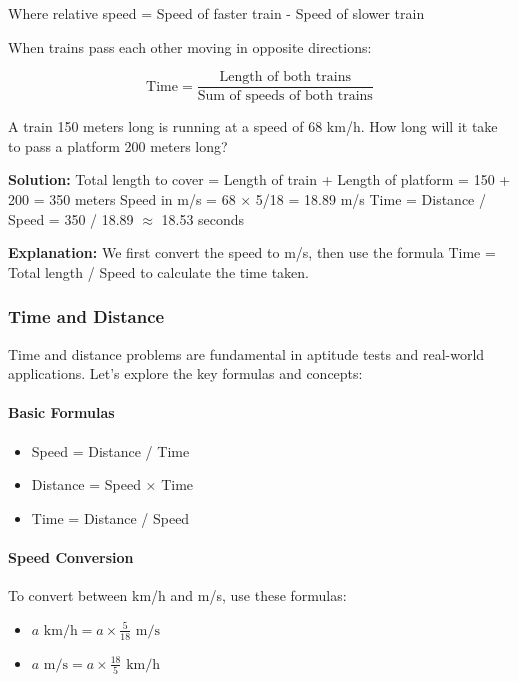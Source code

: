 Where relative speed = Speed of faster train - Speed of slower train

When trains pass each other moving in opposite directions:

\begin{equation}
    \text{Time} = \frac{\text{Length of both trains}}{\text{Sum of speeds of both trains}}
\end{equation}

\begin{example}
A train 150 meters long is running at a speed of 68 km/h. How long will it take to pass a platform 200 meters long?

\textbf{Solution:}
Total length to cover = Length of train + Length of platform = 150 + 200 = 350 meters
Speed in m/s = 68 × 5/18 = 18.89 m/s
Time = Distance / Speed = 350 / 18.89 $\approx$ 18.53 seconds

\textbf{Explanation:} We first convert the speed to m/s, then use the formula Time = Total length / Speed to calculate the time taken.
\end{example}

\subsubsection{Time and Distance}

Time and distance problems are fundamental in aptitude tests and
real-world applications. Let's explore the key formulas and concepts:

\paragraph{Basic Formulas}

\begin{itemize}
    \item Speed = Distance / Time
    \item Distance = Speed × Time
    \item Time = Distance / Speed
\end{itemize}

\paragraph{Speed Conversion}

To convert between km/h and m/s, use these formulas:

\begin{itemize}
    \item $a \text{ km/h} = a \times \frac{5}{18} \text{ m/s}$
    \item $a \text{ m/s} = a \times \frac{18}{5} \text{ km/h}$
\end{itemize}

